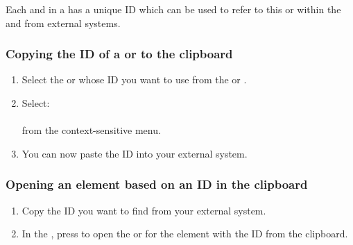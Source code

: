 Each \gdcase{} and \gdsuite{} in a \gdproject{} has a unique ID which can be used to refer to this \gdcase{} or \gdsuite{}  within the \gdproject{} and from external systems.

\subsubsection{Copying the ID of a \gdcase{} or \gdsuite{} to the clipboard}

\begin{enumerate}
\item Select the \gdcase{} or \gdsuite{} whose ID you want to use from the \gdtestcasebrowser{} or \gdtestsuitebrowser{}.
\item Select:\\
\\
from the context-sensitive menu.
\item You can now paste the ID into your external system.
\end{enumerate}


\subsubsection{Opening an element based on an ID in the clipboard}
\begin{enumerate}
\item Copy the ID you want to find from your external system.
\item In the \ite{}, press  to open the \gdtestcaseeditor{} or \gdtestsuiteeditor{}  for the element with the ID from the clipboard.
\end{enumerate}
